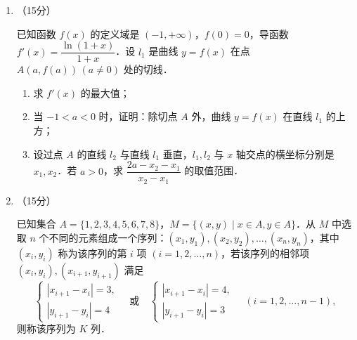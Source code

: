 \begin{description}
\begin{enumerate}[leftmargin=5pt]
        已知椭圆 $E:\dfrac{x^2}{a^2}+\dfrac{y^2}{b^2}=1\,(a>b>0)$ 的离心率为 $\dfrac{\sqrt{2}}{2}$，椭圆 $E$ 上的点到两焦点的距离之和为 $4$．

        \begin{enumerate}[label=(\arabic*)]
            \item 求椭圆 $E$ 的方程；
            \item 设 $O$ 为坐标原点，点 $M(x_0,y_0)\,(x_0\neq0)$ 在椭圆 $E$ 上，直线 $x_0x+2y_0y-4=0$ 与直线 $y=2$，$y=-2$ 分别交于点 $A,B$．设 $\triangle OAM$ 与 $\triangle OBM$ 的面积分别为 $S_1,S_2$，比较 $\dfrac{S_1}{S_2}$ 与 $\dfrac{|OA|}{|OB|}$ 的大小．
        \end{enumerate}

        \item （15分）

        已知函数 $f(x)$ 的定义域是 $(-1,+\infty)$，$f(0)=0$，导函数 $f'(x)=\dfrac{\ln(1+x)}{1+x}$．设 $l_1$ 是曲线 $y=f(x)$ 在点 $A(a,f(a))\,(a\neq0)$ 处的切线．

        \begin{enumerate}[label=(\arabic*)]
            \item 求 $f'(x)$ 的最大值；
            \item 当 $-1<a<0$ 时，证明：除切点 $A$ 外，曲线 $y=f(x)$ 在直线 $l_1$ 的上方；
            \item 设过点 $A$ 的直线 $l_2$ 与直线 $l_1$ 垂直，$l_1,l_2$ 与 $x$ 轴交点的横坐标分别是 $x_1,x_2$．若 $a>0$，求 $\dfrac{2a-x_2-x_1}{x_2-x_1}$ 的取值范围．
        \end{enumerate}

        \item （15分）

        已知集合 $A=\{1,2,3,4,5,6,7,8\}$，$M=\{(x,y)\mid x\in A,y\in A\}$．从 $M$ 中选取 $n$ 个不同的元素组成一个序列：$(x_1,y_1),(x_2,y_2),\dots,(x_n,y_n)$，其中 $(x_i,y_i)$ 称为该序列的第 $i$ 项 $(i=1,2,\dots,n)$，若该序列的相邻项 $(x_i,y_i),(x_{i+1},y_{i+1})$ 满足
        \[
        \begin{cases}
        |x_{i+1}-x_i|=3, \\
        |y_{i+1}-y_i|=4
        \end{cases}
        \quad\text{或}\quad
        \begin{cases}
        |x_{i+1}-x_i|=4, \\
        |y_{i+1}-y_i|=3
        \end{cases}
        \quad(i=1,2,\dots,n-1),
        \]
        则称该序列为 $K$ 列．


\end{enumerate}
\end{description}
